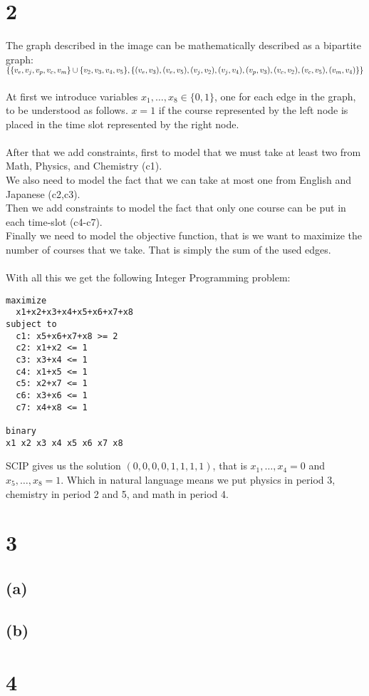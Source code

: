 \documentclass[12pt]{report}
\begin{document}
\section*{2}
The graph described in the image can be mathematically described as a bipartite graph: \\
$ \{ \{v_e,v_j,v_p,v_c,v_m\} \cup \{v_2,v_3,v_4,v_5 \},\\
    \{(v_e,v_3),(v_e,v_5),(v_j,v_2),(v_j,v_4),(v_p,v_3),(v_c,v_2),(v_c,v_5),(v_m,v_4)\}\}$ \\
\\
At first we introduce variables $x_1,\ldots,x_8 \in \{0,1\}$, one for each edge in the graph, to be understood as follows. $x=1$ if the course represented by the left node is placed in the time slot represented by the right node. 
\\
\\
After that we add constraints, first to model that we must take at least two from Math, Physics, and Chemistry (c1).
\\
We also need to model the fact that we can take at most one from English and Japanese (c2,c3).
\\
Then we add constraints to model the fact that only one course can be put in each time-slot (c4-c7).
\\ 
Finally we need to model the objective function, that is we want to maximize the number of courses that we take. That is simply the sum of the used edges.
\\
\\
With all this we get the following Integer Programming problem: \\
\begin{verbatim}
maximize
  x1+x2+x3+x4+x5+x6+x7+x8
subject to
  c1: x5+x6+x7+x8 >= 2
  c2: x1+x2 <= 1
  c3: x3+x4 <= 1
  c4: x1+x5 <= 1
  c5: x2+x7 <= 1
  c6: x3+x6 <= 1
  c7: x4+x8 <= 1

binary
x1 x2 x3 x4 x5 x6 x7 x8
\end{verbatim}

SCIP gives us the solution $(0,0,0,0,1,1,1,1)$, that is $x_1,\ldots,x_4 = 0$ and $x_5,\ldots,x_8 = 1$. Which in natural language means we put physics in period 3, chemistry in period 2 and 5, and math in period 4.

\section*{3}
\subsection*{(a)}


\subsection*{(b)}



\section*{4}
\end{document}
